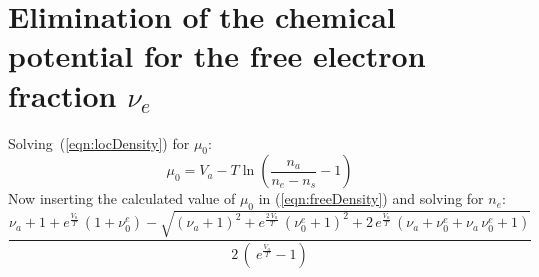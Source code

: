 \documentclass[a4paper,11pt]{article}
\newcommand{\eqref}[1]{(\ref{#1})}
\begin{document}
\section{Elimination of the chemical potential for the free electron fraction $\nu_e$}
Solving~\eqref{eqn:locDensity} for $\mu_0$:
\begin{equation}
	\mu_0=V_a-T\ln\left(\frac{n_a}{n_e-n_s}-1\right)
\end{equation}
Now inserting the calculated value of $\mu_0$ in \eqref{eqn:freeDensity} and solving for $n_e$:
\begin{equation}
\frac{\nu_a +1+ e^{\frac{V_a}{T}}\, \left( 
                1 + \nu^e_0 \right)  - {\sqrt{{\left( \nu_a +1\right) }^2 + e^{\frac{2\, V_a}{T}}\, {\left(\nu^e_0 +1\right) }^2 + 
                      2\, e^{\frac{V_a}{T}}\, \left(\nu_a + \nu^e_0 + \nu_a\, \nu^e_0 +1\right) }}}{2\, \left( \
e^{\frac{V_a}{T}}-1 \right) }
\end{equation}
 
\end{document}
